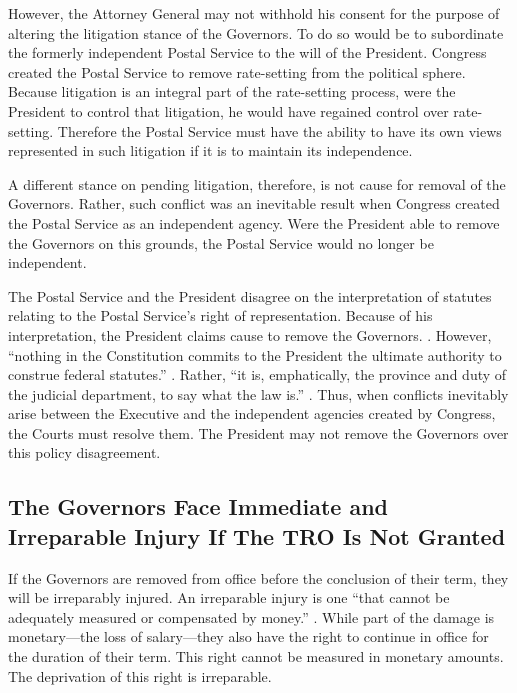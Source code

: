 \documentclass[12pt,\documentclassflag]{lawbrief}
\begin{document}
However, the Attorney General may not withhold his consent for the purpose of altering the litigation stance of the Governors.  To do so would be to subordinate the formerly independent Postal Service to the will of the President.  Congress created the Postal Service to remove rate-setting from the political sphere.  Because litigation is an integral part of the rate-setting process, were the President to control that litigation, he would have regained control over rate-setting.  Therefore the Postal Service must have the ability to have its own views represented in such litigation if it is to maintain its independence.

A different stance on pending litigation, therefore, is not cause for removal of the Governors.  Rather, such conflict was an inevitable result when Congress created the Postal Service as an independent agency.  Were the President able to remove the Governors on this grounds, the Postal Service would no longer be independent. 

The Postal Service and the President disagree on the interpretation of statutes relating to the Postal Service's right of representation.  Because of his interpretation, the President claims cause to remove the Governors.  \See {}. However, ``nothing in the Constitution commits to the President the ultimate authority to construe federal statutes.'' .  Rather, ``it is, emphatically, the province and duty of the judicial department, to say what the law is.'' .  Thus, when conflicts inevitably arise between the Executive and the independent agencies created by Congress, the Courts must resolve them.   The President may not remove the Governors over this policy disagreement.

\subsection{The Governors Face Immediate and Irreparable Injury If The TRO Is Not Granted}

If the Governors are removed from office before the conclusion of their term, they will be irreparably injured.  An irreparable injury is one ``that cannot be adequately measured or compensated by money.'' \cite{Black's Law Dictionary}.  While part of the damage is monetary---the loss of salary---they also have the right to continue in office for the duration of their term.  This right cannot be measured in monetary amounts. The deprivation of this right is irreparable.
\end{document}
